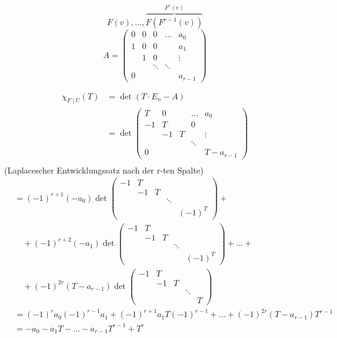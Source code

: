 \documentclass[titlepage,12pt,a4paper,ngerman]{report}
\newcommand{\ob}[1]{\overbrace{#1}}
\begin{document}
$$ F(v) , \dots , \ob{F(F^{r-1}(v))}^{F^r(v)}$$
$$A = \begin{pmatrix}
0 & 0 & 0 & \dots & a_0 \\
1 & 0 & 0 &  & a_1 \\
& 1 & 0 & & \vdots \\
&   & \ddots & \ddots & \\
0 &   &   &   & a_{r-1}
\end{pmatrix} $$

\begin{align*}
\chi_{F\mid U } (T) &= \det (T\cdot E_n -A)\\
&= \det\begin{pmatrix}
T & 0 & & \dots  & a_0 \\
-1 & T & & 0\\
& -1 & T  & & \vdots \\
& & & \ddots \\
0 & & & & T- a_{r-1}
\end{pmatrix} \\
\end{align*}
(Laplacescher Entwicklungssatz nach der r-ten Spalte)\\

\begin{align*}&= (-1)^{r+1} (-a_0) \det \begin{pmatrix}
-1 & T \\
& -1 & T \\
& & & \ddots \\
& & & & (-1) ^T
\end{pmatrix} + \\
& \quad + (-1)^{r+2} (-a_1) \det \begin{pmatrix}
-1 & T \\
& -1 & T \\
& & & \ddots \\
& & & & (-1) ^T
\end{pmatrix} + \dots + \\
& \quad + (-1)^{2r} (T-a_{r-1}) \det \begin{pmatrix}
-1 & T \\
& -1 & T \\
& & & \ddots \\
& & & & T
\end{pmatrix}\\
&= (-1)^r a_0 (-1)^{r-1} a_1 + (-1)^{r+1} a_1 T (-1)^{r-1} + \dots + (-1)^{2r} (T-a_{r-1}) T^{r-1}\\
& = -a_0 - a_1 T - \dots - a_{r-1} T^{r-1} + T^r 
\end{align*}
\end{document}
